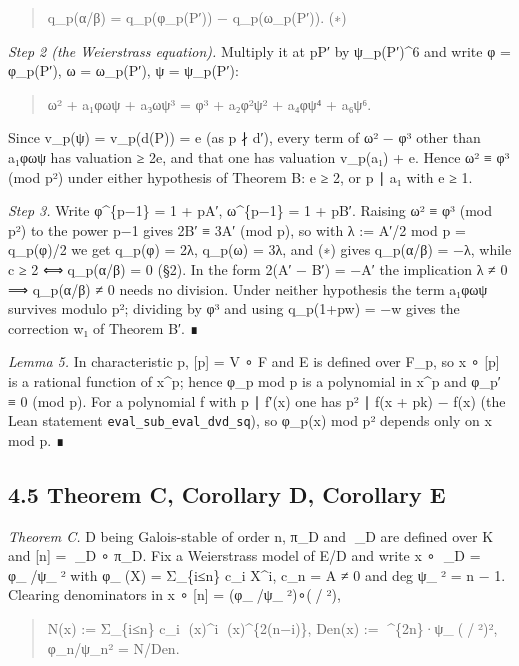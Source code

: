 \documentclass[11pt,a4paper]{article}
\theoremstyle{named}
\begin{document}
\begin{quote}
q\_p(α/β) = q\_p(φ\_p(P′)) − q\_p(ω\_p(P′)).  (∗)
\end{quote}

\textit{Step 2 (the Weierstrass equation).} Multiply it at pP′ by ψ\_p(P′)\textasciicircum{}6 and write φ = φ\_p(P′), ω = ω\_p(P′), ψ = ψ\_p(P′):

\begin{quote}
ω² + a₁φωψ + a₃ωψ³ = φ³ + a₂φ²ψ² + a₄φψ⁴ + a₆ψ⁶.
\end{quote}

Since v\_p(ψ) = v\_p(d(P)) = e (as p ∤ d′), every term of ω² − φ³ other than a₁φωψ has valuation ≥ 2e, and that one has valuation v\_p(a₁) + e. Hence ω² ≡ φ³ (mod p²) under either hypothesis of Theorem B: e ≥ 2, or p ∣ a₁ with e ≥ 1.

\textit{Step 3.} Write φ\textasciicircum{}\{p−1\} = 1 + pA′, ω\textasciicircum{}\{p−1\} = 1 + pB′. Raising ω² ≡ φ³ (mod p²) to the power p−1 gives 2B′ ≡ 3A′ (mod p), so with λ := A′/2 mod p = q\_p(φ)/2 we get q\_p(φ) = 2λ, q\_p(ω) = 3λ, and (∗) gives q\_p(α/β) = −λ, while c ≥ 2 ⟺ q\_p(α/β) = 0 (§2). In the form 2(A′ − B′) = −A′ the implication λ ≠ 0 ⟹ q\_p(α/β) ≠ 0 needs no division. Under neither hypothesis the term a₁φωψ survives modulo p²; dividing by φ³ and using q\_p(1+pw) = −w gives the correction w₁ of Theorem B′. ∎

\textit{Lemma 5.} In characteristic p, [p] = V ∘ F and E is defined over F\_p, so x ∘ [p] is a rational function of x\textasciicircum{}p; hence φ\_p mod p is a polynomial in x\textasciicircum{}p and φ\_p′ ≡ 0 (mod p). For a polynomial f with p ∣ f′(x) one has p² ∣ f(x + pk) − f(x) (the Lean statement \texttt{eval\_\allowbreak{}sub\_\allowbreak{}eval\_\allowbreak{}dvd\_\allowbreak{}sq}), so φ\_p(x) mod p² depends only on x mod p. ∎

\subsection*{4.5 Theorem C, Corollary D, Corollary E}

\textit{Theorem C.} D being Galois-stable of order n, π\_D and \_D are defined over K and [n] = \_D ∘ π\_D. Fix a Weierstrass model of E/D and write x ∘ \_D = φ\_/ψ\_² with φ\_(X) = Σ\_\{i≤n\} c\_i X\textasciicircum{}i, c\_n = A ≠ 0 and deg ψ\_² = n − 1. Clearing denominators in x ∘ [n] = (φ\_/ψ\_²)∘(/²),

\begin{quote}
N(x) := Σ\_\{i≤n\} c\_i (x)\textasciicircum{}i (x)\textasciicircum{}\{2(n−i)\},  Den(x) := \textasciicircum{}\{2n\}·ψ\_(/²)²,  φ\_n/ψ\_n² = N/Den.
\end{quote}
\end{document}
